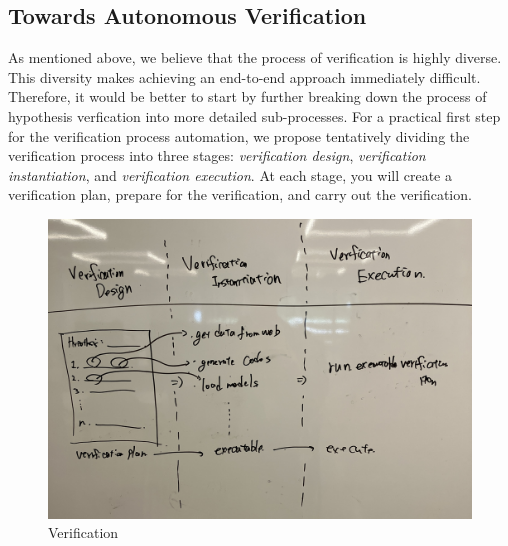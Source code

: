 

\subsection{Towards Autonomous Verification}

As mentioned above, we believe that the process of verification is highly diverse. This diversity makes achieving an end-to-end approach immediately difficult. Therefore, it would be better to start by further breaking down the process of hypothesis verfication into more detailed sub-processes. For a practical first step for the verification process automation, we propose tentatively dividing the verification process into three stages: \textit{verification design}, \textit{verification instantiation}, and \textit{verification execution}. At each stage, you will create a verification plan, prepare for the verification, and carry out the verification.

\begin{figure}[htb]
    \centering
    \includegraphics[width=\textwidth]{figs/verification.jpg}
    \caption{Verification}
    \label{fig:verification}
\end{figure}

